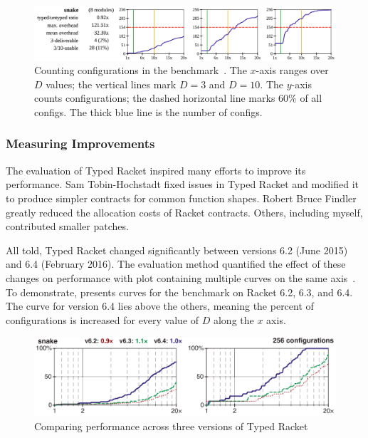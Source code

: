 \begin{figure}[h]
\includegraphics[width=0.96\columnwidth]{src/snake-popl.png}
\caption{Counting  configurations in the 
         benchmark~\cite{tfgnvf-popl-2016}. The $x$-axis ranges over $D$ values;
         the vertical lines mark $D=3$ and $D=10$.
         The $y$-axis counts configurations; the dashed horizontal line marks
         $60$\% of all configs.
         The thick blue line is the number of  configs.}
\label{fig:snake-popl}
\end{figure}


\subsubsection{Measuring Improvements}

The evaluation of Typed Racket inspired many efforts to improve its performance.
Sam Tobin-Hochstadt fixed issues in Typed Racket and modified it to produce
 simpler contracts for common function shapes.
Robert Bruce Findler greatly reduced the allocation costs of Racket contracts.
Others, including myself, contributed smaller patches.

All told, Typed Racket changed significantly between versions 6.2 (June 2015)
 and 6.4 (February 2016).
The evaluation method quantified the effect of these changes on
 performance with plot containing multiple  curves on the same
 axis~\cite{gtnffvf-jfp-2019}.
To demonstrate,  presents curves for the 
 benchmark on Racket 6.2, 6.3, and 6.4.
The curve for version 6.4 lies above the others, meaning the percent of
  configurations is increased for every value of $D$ along
 the $x$ axis.

\begin{figure}[h]
\includegraphics[width=0.8\columnwidth]{src/snake-jfp.png}
\caption{Comparing performance across three versions of Typed Racket}
\label{fig:snake-jfp}
\end{figure}

